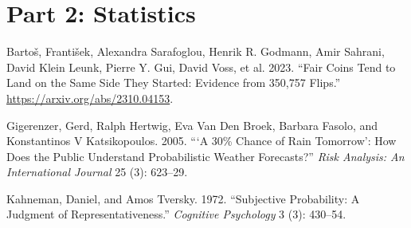 \documentclass[
  letterpaper,
  DIV=11,
  numbers=noendperiod]{scrreprt}
\newlength{\cslhangindent}
\newenvironment{CSLReferences}[2] %
 {\begin{list}{}{%
  \setlength{\itemindent}{0pt}
  \setlength{\leftmargin}{0pt}
  \setlength{\parsep}{0pt}
  \ifodd #1
   \setlength{\leftmargin}{\cslhangindent}
   \setlength{\itemindent}{-1\cslhangindent}
  \fi
  \setlength{\itemsep}{#2\baselineskip}}}
 {\end{list}}
\theoremstyle{definition}
\theoremstyle{definition}
\theoremstyle{definition}
\theoremstyle{remark}
\begin{document}

\part{Part 2: Statistics}

\label{refs}
\begin{CSLReferences}{1}{0}
Bartoš, František, Alexandra Sarafoglou, Henrik R. Godmann, Amir
Sahrani, David Klein Leunk, Pierre Y. Gui, David Voss, et al. 2023.
{``Fair Coins Tend to Land on the Same Side They Started: Evidence from
350,757 Flips.''} \url{https://arxiv.org/abs/2310.04153}.

Gigerenzer, Gerd, Ralph Hertwig, Eva Van Den Broek, Barbara Fasolo, and
Konstantinos V Katsikopoulos. 2005. {``{`A 30\% Chance of Rain
Tomorrow'}: How Does the Public Understand Probabilistic Weather
Forecasts?''} \emph{Risk Analysis: An International Journal} 25 (3):
623--29.

Kahneman, Daniel, and Amos Tversky. 1972. {``Subjective Probability: A
Judgment of Representativeness.''} \emph{Cognitive Psychology} 3 (3):
430--54.

\end{CSLReferences}
\end{document}
